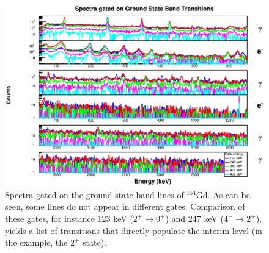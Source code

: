 \begin{figure}[!]
    \centering
    \includegraphics[scale=0.8]{154GdTablesAndFigs/154Gd_stacked.eps}
    \caption{Spectra gated on the ground state band lines of $^{154}$Gd. As can be seen, some lines do not appear in different gates. Comparison of these gates, for instance 123 keV ($2^+\rightarrow0^+$) and 247 keV ($4^+\rightarrow2^+$), yields a list of transitions that directly populate the interim level (in the example, the $2^+$ state).}
    \label{fig:154_GS_Gate}
\end{figure}
